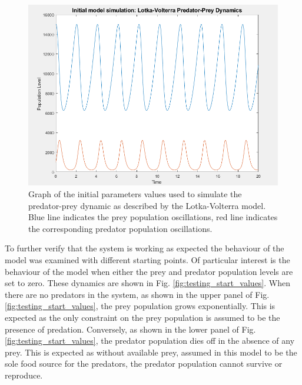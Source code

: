 \documentclass{article}
\begin{document}
\begin{figure}[H]
  \includegraphics[scale = 0.6]{initial_model.PNG}
  \caption{Graph of the initial parameters values used to simulate the predator-prey dynamic as described by the Lotka-Volterra model. Blue line indicates the prey population oscillations, red line indicates the corresponding predator population oscillations.}
  \label{fig:intialModel}
\end{figure}

To further verify that the system is working as expected the behaviour of the model was examined with different starting points. Of particular interest is the behaviour of the model when either the prey and predator population levels are set to zero. These dynamics are shown in Fig. \ref{fig:testing_start_values}. When there are no predators in the system, as shown in the upper panel of Fig. \ref{fig:testing_start_values}, the prey population grows exponentially. This is expected as the only constraint on the prey population is assumed to be the presence of predation. Conversely, as shown in the lower panel of Fig. \ref{fig:testing_start_values}, the predator population dies off in the absence of any prey. This is expected as without available prey, assumed in this model to be the sole food source for the predators, the predator population cannot survive or reproduce. 
\end{document}
